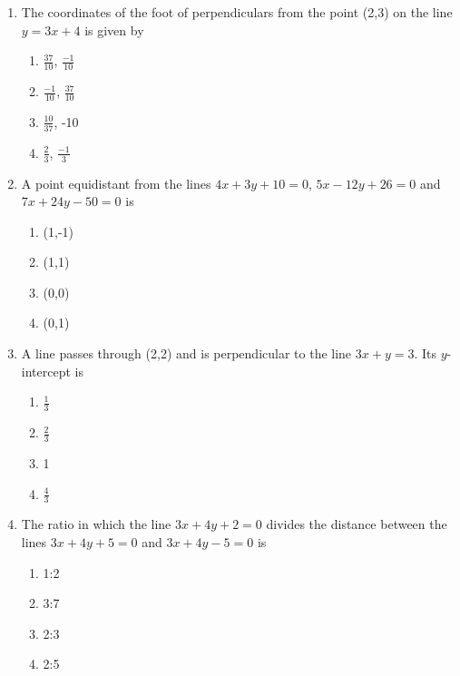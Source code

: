 \begin{enumerate}[label=\thesubsection.\arabic*,ref=\thesubsection.\theenumi]
\item The coordinates of the foot of perpendiculars from the point (2,3) on the line $y=3x+4$ is given by 
\begin{enumerate} 
\item $\frac{37}{10}$, $\frac{-1}{10}$
\item $\frac{-1}{10}$, $\frac{37}{10}$
\item $\frac{10}{37}$, -10
\item $\frac{2}{3}$, $\frac{-1}{3}$
\end{enumerate}
\item A point equidistant from the lines $4x+3y+10=0$, $5x-12y+26=0$ and $7x+24y-50=0$ is
\begin{enumerate}
\item (1,-1)
\item (1,1)
\item (0,0)
\item (0,1)
\end{enumerate}
\item A line passes through (2,2) and is perpendicular to the line $3x+y=3$. Its $y$-intercept is 
\begin{enumerate}
\item $\frac{1}{3}$
\item $\frac{2}{3}$
\item 1
\item $\frac{4}{3}$
\end{enumerate}
\item The ratio in which the line $3x+4y+2=0$ divides the distance between the lines $3x+4y+5=0$ and $3x+4y-5=0$ is
\begin{enumerate}
\item 1:2
\item 3:7
\item 2:3
\item 2:5
\end{enumerate}
\end{enumerate}
